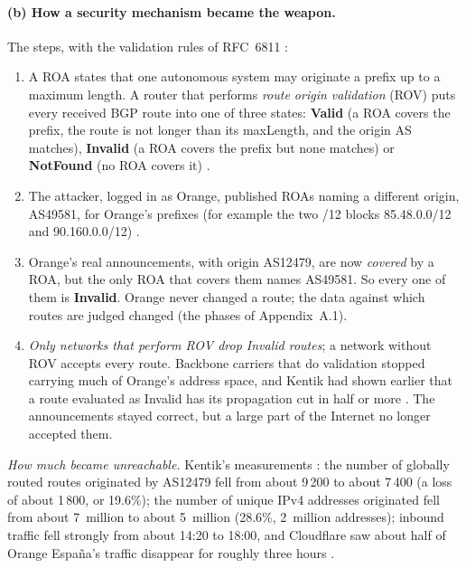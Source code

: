 \documentclass[11pt,a4paper]{article}
\begin{document}
\paragraph{(b) How a security mechanism became the weapon.} The steps, with the validation rules of RFC~6811 \cite{rfc6811}:
\begin{enumerate}[label=\arabic*.]
\item A ROA states that one autonomous system may originate a prefix up to a maximum length. A router that performs
\emph{route origin validation} (ROV) puts every received BGP route into one of three states: \textbf{Valid} (a ROA covers the prefix,
the route is not longer than its maxLength, and the origin AS matches), \textbf{Invalid} (a ROA covers the prefix but none matches) or
\textbf{NotFound} (no ROA covers it) \cite{rfc6811}.
\item The attacker, logged in as Orange, published ROAs naming a different origin, AS49581, for Orange's prefixes (for example the
two /12 blocks 85.48.0.0/12 and 90.160.0.0/12) \cite{apnic}.
\item Orange's real announcements, with origin AS12479, are now \emph{covered} by a ROA, but the only ROA that covers them names AS49581. So
every one of them is \textbf{Invalid}. Orange never changed a route; the data against which routes are judged changed (the phases of
Appendix~A.1).
\item \emph{Only networks that perform ROV drop Invalid routes}; a network without ROV accepts every route. Backbone carriers that do
validation stopped carrying much of Orange's address space, and Kentik had shown earlier that a route evaluated as Invalid has its
propagation cut in half or more \cite{apnic}. The announcements stayed correct, but a large part of the Internet no longer accepted them.
\end{enumerate}
\emph{How much became unreachable.} Kentik's measurements \cite{apnic}: the number of globally routed routes originated by AS12479 fell from
about 9\,200 to about 7\,400 (a loss of about 1\,800, or 19.6\%); the number of unique IPv4 addresses originated fell from about 7~million to
about 5~million (28.6\%, 2~million addresses); inbound traffic fell strongly from about 14:20 to 18:00, and Cloudflare saw about half of
Orange España's traffic disappear for roughly three hours \cite{record}.
\end{document}
